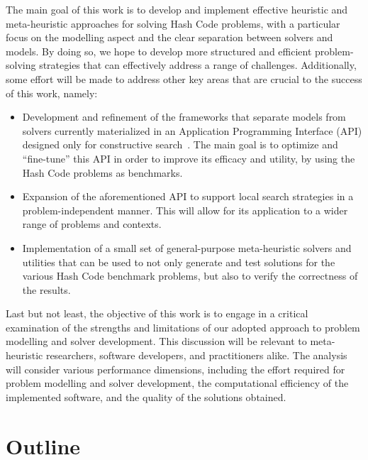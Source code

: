 The main goal of this work is to develop and implement effective heuristic and
meta-heuristic approaches for solving Hash Code problems, with a particular
focus on the modelling aspect and the clear separation between solvers and
models. By doing so, we hope to develop more structured and efficient
problem-solving strategies that can effectively address a range of challenges.
Additionally, some effort will be made to address other key areas that are
crucial to the success of this work, namely:

\begin{itemize}
      \item Development and refinement of the frameworks that separate models from solvers
            currently materialized in an Application Programming Interface (API)
            designed only for constructive search~\cite{outeiro2021application}.
            The main goal is to optimize and ``fine-tune'' this API in order to improve its
            efficacy and utility, by using the Hash Code problems as benchmarks.

      \item Expansion of the aforementioned API to support local search strategies
            in a problem-independent manner. This will allow for its application to a wider
            range of problems and contexts.

      \item Implementation of a small set of general-purpose meta-heuristic solvers and utilities
            that can be used to not only generate and test solutions for the various
            Hash Code benchmark problems, but also to verify the correctness of the results.
\end{itemize}

Last but not least, the objective of this work is to engage in a critical
examination of the strengths and limitations of our adopted approach to problem
modelling and solver development. This discussion will be relevant to
meta-heuristic researchers, software developers, and practitioners alike. The
analysis will consider various performance dimensions, including the effort
required for problem modelling and solver development, the computational
efficiency of the implemented software, and the quality of the solutions
obtained.

\section{Outline}
\label{section:outline}

